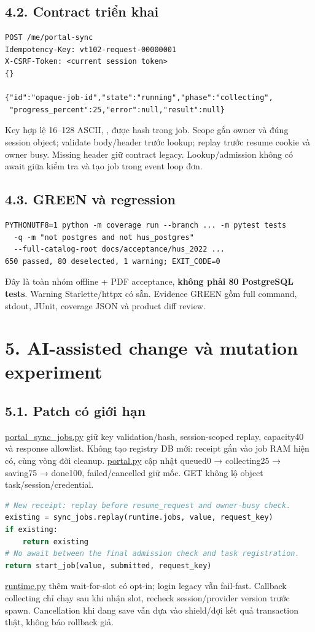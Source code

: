 \documentclass[10pt,a4paper]{article}
\newcommand{\code}[1]{{\small\expandafter\path\expandafter{#1}}}
\newcommand{\Green}{7a06e62}
\newcommand{\repo}{https://github.com/5-Bit-System/SE_Project}
\newcommand{\src}[2]{\href{\repo/blob/\Green/#1}{#2}}
\begin{document}
\subsection*{4.2. Contract triển khai}
\begin{lstlisting}
POST /me/portal-sync
Idempotency-Key: vt102-request-00000001
X-CSRF-Token: <current session token>
{}

{"id":"opaque-job-id","state":"running","phase":"collecting",
 "progress_percent":25,"error":null,"result":null}
\end{lstlisting}
Key hợp lệ 16–128 ASCII, \code{[A-Za-z0-9_-]}, được hash trong job. Scope gắn owner và đúng session object;
validate body/header trước lookup; replay trước resume cookie và owner busy. Missing header giữ contract legacy.
Lookup/admission không có await giữa kiểm tra và tạo job trong event loop đơn.

\subsection*{4.3. GREEN và regression}
\begin{lstlisting}
PYTHONUTF8=1 python -m coverage run --branch ... -m pytest tests
  -q -m "not postgres and not hus_postgres"
  --full-catalog-root docs/acceptance/hus_2022 ...
650 passed, 80 deselected, 1 warning; EXIT_CODE=0
\end{lstlisting}
Đây là toàn nhóm offline + PDF acceptance, \textbf{không phải 80 PostgreSQL tests}. Warning Starlette/httpx có sẵn.
Evidence GREEN gồm full command, stdout, JUnit, coverage JSON và product diff review.
\clearpage

\section*{5. AI-assisted change và mutation experiment}
\subsection*{5.1. Patch có giới hạn}
\src{app/services/portal_sync_jobs.py}{portal\_sync\_jobs.py} giữ key validation/hash, session-scoped replay,
capacity40 và response allowlist. Không tạo registry DB mới: receipt gắn vào job RAM hiện có, cùng vòng đời cleanup.
\src{app/api/portal.py}{portal.py} cập nhật queued0 → collecting25 → saving75 → done100,
failed/cancelled giữ mốc. GET không lộ object task/session/credential.

\begin{lstlisting}[language=Python]
# New receipt: replay before resume_request and owner-busy check.
existing = sync_jobs.replay(runtime.jobs, value, request_key)
if existing:
    return existing
# No await between the final admission check and task registration.
return start_job(value, submitted, request_key)
\end{lstlisting}
\src{app/integrations/daotao/runtime.py}{runtime.py} thêm wait-for-slot có opt-in; login legacy vẫn fail-fast.
Callback collecting chỉ chạy sau khi nhận slot, recheck session/provider version trước spawn.
Cancellation khi đang save vẫn dựa vào shield/đợi kết quả transaction thật, không báo rollback giả.
\end{document}
